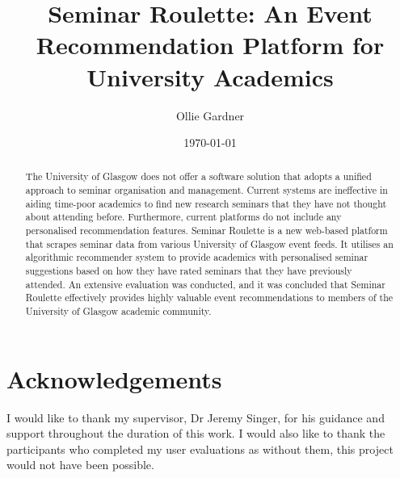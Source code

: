 \documentclass{l4proj}
\begin{document}
\title{Seminar Roulette: An Event Recommendation Platform for University Academics}
\author{Ollie Gardner}
\date{\today}

\maketitle

\begin{abstract}

The University of Glasgow does not offer a software solution that adopts a unified approach to seminar organisation and management. Current systems are ineffective in aiding time-poor academics to find new research seminars that they have not thought about attending before. Furthermore, current platforms do not include any personalised recommendation features. Seminar Roulette is a new web-based platform that scrapes seminar data from various University of Glasgow event feeds. It utilises an algorithmic recommender system to provide academics with personalised seminar suggestions based on how they have rated seminars that they have previously attended. An extensive evaluation was conducted, and it was concluded that Seminar Roulette effectively provides highly valuable event recommendations to members of the University of Glasgow academic community.

\end{abstract}

\chapter*{Acknowledgements}

I would like to thank my supervisor, Dr Jeremy Singer, for his guidance and support throughout the duration of this work. I would also like to thank the participants who completed my user evaluations as without them, this project would not have been possible.


%
%
\def\consentname {Ollie Gardner} %
\def\consentdate {\today} %
%
\educationalconsent
\end{document}
